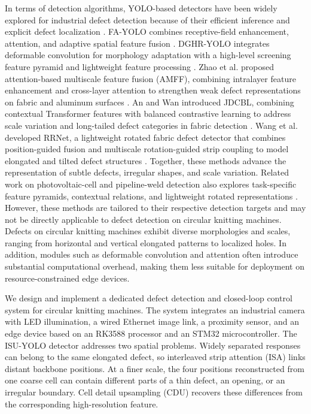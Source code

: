 \documentclass[lettersize,journal]{IEEEtran}
\begin{document}
In terms of detection algorithms, YOLO-based detectors have been widely explored for industrial defect detection because of their efficient inference and explicit defect localization \cite{redmon2016yolo}. FA-YOLO combines receptive-field enhancement, attention, and adaptive spatial feature fusion \cite{yu2024fayolo}. DGHR-YOLO integrates deformable convolution for morphology adaptation with a high-level screening feature pyramid and lightweight feature processing \cite{zhang2025dghr}. Zhao et al. proposed attention-based multiscale feature fusion (AMFF), combining intralayer feature enhancement and cross-layer attention to strengthen weak defect representations on fabric and aluminum surfaces \cite{zhao2024amff}. An and Wan introduced JDCBL, combining contextual Transformer features with balanced contrastive learning to address scale variation and long-tailed defect categories in fabric detection \cite{an2025jdcbl}. Wang et al. developed RRNet, a lightweight rotated fabric defect detector that combines position-guided fusion and multiscale rotation-guided strip coupling to model elongated and tilted defect structures \cite{wang2026rrnet}. Together, these methods advance the representation of subtle defects, irregular shapes, and scale variation. Related work on photovoltaic-cell and pipeline-weld detection also explores task-specific feature pyramids, contextual relations, and lightweight rotated representations \cite{su2022baf,shen2024crnet,liu2025lrnet}. However, these methods are tailored to their respective detection targets and may not be directly applicable to defect detection on circular knitting machines. Defects on circular knitting machines exhibit diverse morphologies and scales, ranging from horizontal and vertical elongated patterns to localized holes. In addition, modules such as deformable convolution and attention often introduce substantial computational overhead, making them less suitable for deployment on resource-constrained edge devices.

We design and implement a dedicated defect detection and closed-loop control system for circular knitting machines. The system integrates an industrial camera with LED illumination, a wired Ethernet image link, a proximity sensor, and an edge device based on an RK3588 processor and an STM32 microcontroller. The ISU-YOLO detector addresses two spatial problems. Widely separated responses can belong to the same elongated defect, so interleaved strip attention (ISA) links distant backbone positions. At a finer scale, the four positions reconstructed from one coarse cell can contain different parts of a thin defect, an opening, or an irregular boundary. Cell detail upsampling (CDU) recovers these differences from the corresponding high-resolution feature.
\end{document}
